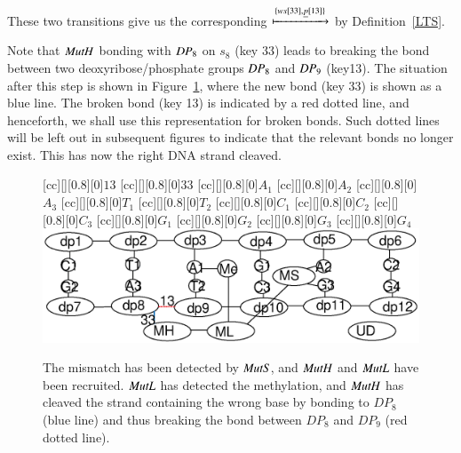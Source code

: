 These two transitions give us the corresponding $\xmapsto{\{ws[33],\underline{p}[13]\}}$ by Definition~\ref{LTS}.

Note that $\mathit{MutH}$ bonding with $\mathit{DP}_8$ on $s_8$ (key 33) leads to breaking the bond between two deoxyribose/phosphate groups $\mathit{DP}_8$ and $\mathit{DP}_9$ (key13). 
%
%
The situation after this step is shown in Figure~\ref{fig:state2}, where the new bond (key 33) is shown as a blue line. The broken bond (key 13) is indicated by a red dotted line, and henceforth, we shall use this representation for broken bonds. Such dotted lines will be left out in subsequent figures to indicate that the relevant bonds no longer exist.  This has now the right DNA strand cleaved.

\begin{figure}[h!]
[cc][][0.8][0]{$13$}
[cc][][0.8][0]{$33$}
[cc][][0.8][0]{$A_1$}
[cc][][0.8][0]{$A_2$}
[cc][][0.8][0]{$A_3$}
[cc][][0.8][0]{$T_1$}
[cc][][0.8][0]{$T_2$}
[cc][][0.8][0]{$C_1$}
[cc][][0.8][0]{$C_2$}
[cc][][0.8][0]{$C_3$}
[cc][][0.8][0]{$G_1$}
[cc][][0.8][0]{$G_2$}
[cc][][0.8][0]{$G_3$}
[cc][][0.8][0]{$G_4$}
  \centering
    \includegraphics[width=1.0\textwidth]{mmr/state2}
  \caption[A six base pair DNA fragment.]{%
  The mismatch has been detected by $\mathit{MutS}$, and $\mathit{MutH}$ and $\mathit{MutL}$ have been recruited. $\mathit{MutL}$ has detected the methylation, and $\mathit{MutH}$ has cleaved the strand containing the wrong base by bonding to $DP_8$ (blue line) and thus breaking the bond between $DP_8$ and $DP_9$ (red dotted line).}
  \label{fig:state2}
\end{figure}

